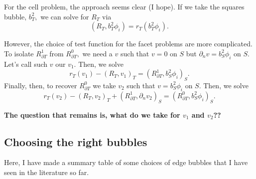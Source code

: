 \documentclass[12pt,a4paper]{article}
\begin{document}
For the cell problem, the approach seems clear (I hope). If we take the squares bubble, $b_T^2,$ we can solve for $R_T$ via
\begin{equation}
    (R_T, b_T^2 \phi_i) = r_T(b_T^2 \phi_i).
\end{equation}


However, the choice of test function for the facet problems are more complicated. To isolate $R_{\partial T}^1$ from $R_{\partial T}^0,$ we need a $v$ such that $v = 0$ on $S$ but $\partial_nv = b_S^2 \phi_i$ on $S.$ Let's call such $v$ our $v_1.$ Then, we solve 
\begin{equation}
    r_T(v_1) - (R_T, v_1)_T = (R_{\partial T}^1, b_S^2\phi_i)_S.
\end{equation}
Finally, then, to recover $R_{\partial T}^0$ we take $v_2$ such that $v = b_S^2 \phi_i$ on $S.$ Then, we solve 
\begin{equation}
    r_T(v_2) - (R_T, v_2)_T + (R_{\partial T}^1, \partial_nv_2)_S = (R_{\partial T}^0, b_S^2\phi_i)_S. 
\end{equation}

\textbf{The question that remains is, what do we take for $v_1$ and $v_2$??}



\subsection{Choosing the right bubbles}

Here, I have made a summary table of some choices of edge bubbles that I have seen in the literature so far.
\end{document}
